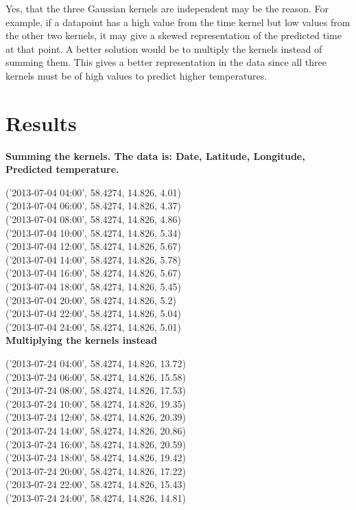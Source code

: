 \documentclass[a4paper,titlepage,12pt]{article}
\begin{document}
Yes, that the three Gaussian kernels are independent may be the reason. For
example, if a datapoint has a high value from the time kernel but low values
from the other two kernels, it may give a skewed representation of the predicted
time at that point.
A better solution would be to multiply the kernels instead
of summing them. This gives a better representation in the data since all three
kernels must be of high values to predict higher temperatures. 

\section{Results}

\textbf{Summing the kernels. The data is: Date, Latitude, Longitude, Predicted temperature.}

('2013-07-04 04:00', 58.4274, 14.826, 4.01) \\
('2013-07-04 06:00', 58.4274, 14.826, 4.37) \\
('2013-07-04 08:00', 58.4274, 14.826, 4.86) \\
('2013-07-04 10:00', 58.4274, 14.826, 5.34) \\
('2013-07-04 12:00', 58.4274, 14.826, 5.67) \\
('2013-07-04 14:00', 58.4274, 14.826, 5.78) \\
('2013-07-04 16:00', 58.4274, 14.826, 5.67) \\
('2013-07-04 18:00', 58.4274, 14.826, 5.45) \\
('2013-07-04 20:00', 58.4274, 14.826, 5.2) \\
('2013-07-04 22:00', 58.4274, 14.826, 5.04) \\
('2013-07-04 24:00', 58.4274, 14.826, 5.01) \\

\textbf{Multiplying the kernels instead}

('2013-07-24 04:00', 58.4274, 14.826, 13.72) \\
('2013-07-24 06:00', 58.4274, 14.826, 15.58) \\
('2013-07-24 08:00', 58.4274, 14.826, 17.53) \\
('2013-07-24 10:00', 58.4274, 14.826, 19.35) \\
('2013-07-24 12:00', 58.4274, 14.826, 20.39) \\
('2013-07-24 14:00', 58.4274, 14.826, 20.86) \\
('2013-07-24 16:00', 58.4274, 14.826, 20.59) \\
('2013-07-24 18:00', 58.4274, 14.826, 19.42) \\
('2013-07-24 20:00', 58.4274, 14.826, 17.22) \\
('2013-07-24 22:00', 58.4274, 14.826, 15.43) \\
('2013-07-24 24:00', 58.4274, 14.826, 14.81) \\
\end{document}

